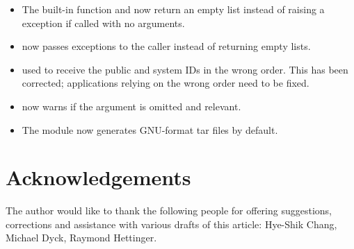 \documentclass{howto}
\begin{document}
\begin{itemize}

\item The  built-in function and 
  now return  an empty list instead of raising a 
  exception if called with no arguments.

\item {} now passes exceptions to the caller
      instead of returning empty lists.

\item {} used to receive the public and
  system IDs in the wrong order.  This has been corrected; applications
  relying on the wrong order need to be fixed.

\item {} now warns if the  
 argument is omitted and relevant.

\item The  module now generates GNU-format tar files
by default.

\end{itemize}


\section{Acknowledgements \label{acks}}

The author would like to thank the following people for offering
suggestions, corrections and assistance with various drafts of this
article: Hye-Shik Chang, Michael Dyck, Raymond Hettinger.
\end{document}
